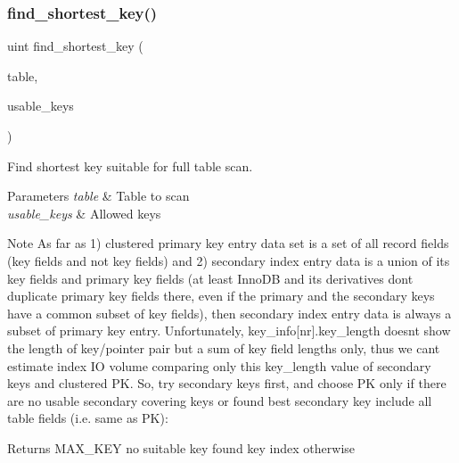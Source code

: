 \subsubsection{\texorpdfstring{find\+\_\+shortest\+\_\+key()}{find\_shortest\_key()}}
{\footnotesize\ttfamily uint find\+\_\+shortest\+\_\+key (\begin{DoxyParamCaption}\item[{\mbox{\hyperlink{structTABLE}{T\+A\+B\+LE}} $\ast$}]{table,  }\item[{const \mbox{\hyperlink{classBitmap_3_0164_01_4}{key\+\_\+map}} $\ast$}]{usable\+\_\+keys }\end{DoxyParamCaption})}

Find shortest key suitable for full table scan.


\begin{DoxyParams}{Parameters}
{\em table} & Table to scan \\
\hline
{\em usable\+\_\+keys} & Allowed keys\\
\hline
\end{DoxyParams}
\begin{DoxyNote}{Note}
As far as 1) clustered primary key entry data set is a set of all record fields (key fields and not key fields) and 2) secondary index entry data is a union of its key fields and primary key fields (at least Inno\+DB and its derivatives don\textquotesingle{}t duplicate primary key fields there, even if the primary and the secondary keys have a common subset of key fields), then secondary index entry data is always a subset of primary key entry. Unfortunately, key\+\_\+info\mbox{[}nr\mbox{]}.key\+\_\+length doesn\textquotesingle{}t show the length of key/pointer pair but a sum of key field lengths only, thus we can\textquotesingle{}t estimate index IO volume comparing only this key\+\_\+length value of secondary keys and clustered PK. So, try secondary keys first, and choose PK only if there are no usable secondary covering keys or found best secondary key include all table fields (i.\+e. same as PK)\+:
\end{DoxyNote}
\begin{DoxyReturn}{Returns}
M\+A\+X\+\_\+\+K\+EY no suitable key found key index otherwise 
\end{DoxyReturn}
\mbox{\label{group__Query__Optimizer_ga59080a3acd829efcf18fc56d51df215c}} 
